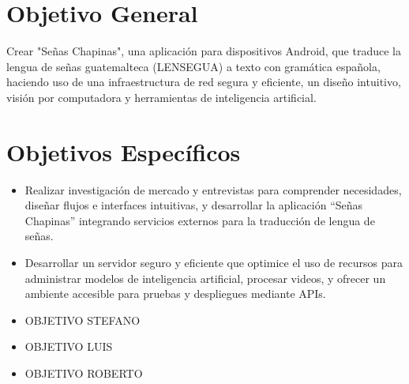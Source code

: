 \section{Objetivo General}
Crear "Señas Chapinas", una aplicación para dispositivos Android, que traduce la lengua de señas guatemalteca (LENSEGUA) a texto con gramática española, haciendo uso de una infraestructura de red segura  y eficiente, un diseño intuitivo, visión por computadora y herramientas de inteligencia artificial. 

\section{Objetivos Específicos}
\begin{itemize}

\item Realizar investigación de mercado y entrevistas para comprender necesidades, diseñar flujos e interfaces intuitivas, y desarrollar la aplicación ``Señas Chapinas'' integrando servicios externos para la traducción de lengua de señas.

\item Desarrollar un servidor seguro y eficiente que optimice el uso de recursos para administrar modelos de inteligencia artificial, procesar videos, y ofrecer un ambiente accesible para pruebas y despliegues mediante APIs.

\item OBJETIVO STEFANO
\item OBJETIVO LUIS
\item OBJETIVO ROBERTO

\end{itemize}